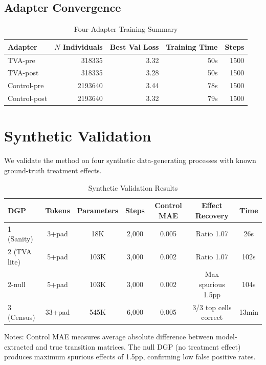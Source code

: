 \documentclass[12pt]{article}
\begin{document}
\subsection{Adapter Convergence}

\begin{table}[H]
\centering
\caption{Four-Adapter Training Summary}
\label{tab:adapter_training}
\begin{tabular}{lrrrr}
\toprule
Adapter & $N$ Individuals & Best Val Loss & Training Time & Steps \\
\midrule
TVA-pre & \num{318335} & 3.32 & 50s & \num{1500} \\
TVA-post & \num{318335} & 3.28 & 50s & \num{1500} \\
Control-pre & \num{2193640} & 3.44 & 78s & \num{1500} \\
Control-post & \num{2193640} & 3.32 & 79s & \num{1500} \\
\bottomrule
\end{tabular}
\end{table}


\section{Synthetic Validation}
\label{app:validation}

We validate the method on four synthetic data-generating processes with known ground-truth treatment effects.

\begin{table}[H]
\centering
\caption{Synthetic Validation Results}
\label{tab:synthetic}
\begin{threeparttable}
\begin{tabular}{lcccccc}
\toprule
DGP & Tokens & Parameters & Steps & Control MAE & Effect Recovery & Time \\
\midrule
1 (Sanity) & 3+pad & 18K & 2,000 & 0.005 & Ratio 1.07 & 26s \\
2 (TVA lite) & 5+pad & 103K & 3,000 & 0.002 & Ratio 1.07 & 102s \\
2-null & 5+pad & 103K & 3,000 & 0.002 & Max spurious 1.5pp & 104s \\
3 (Census) & 33+pad & 545K & 6,000 & 0.005 & 3/3 top cells correct & 13min \\
\bottomrule
\end{tabular}
\begin{tablenotes}[flushleft]
\small
\item Notes: Control MAE measures average absolute difference between model-extracted and true transition matrices. The null DGP (no treatment effect) produces maximum spurious effects of 1.5pp, confirming low false positive rates.
\end{tablenotes}
\end{threeparttable}
\end{table}
\end{document}
